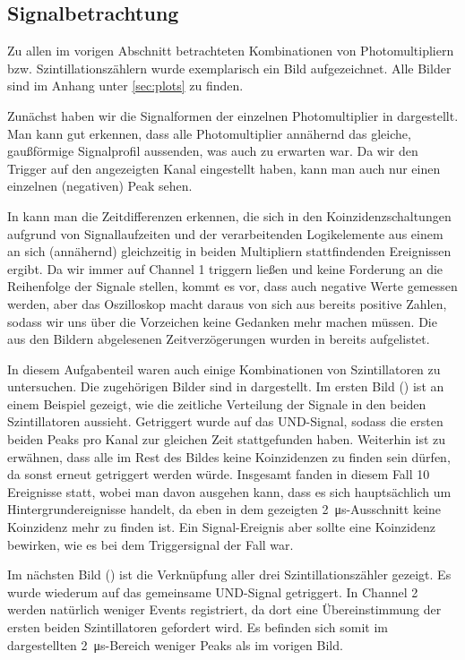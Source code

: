 \subsection{Signalbetrachtung}
Zu allen im vorigen Abschnitt betrachteten Kombinationen von Photomultipliern
bzw. Szintillationszählern wurde exemplarisch ein Bild aufgezeichnet. Alle
Bilder sind im Anhang unter \ref{sec:plots} zu finden.

Zunächst haben wir die Signalformen der einzelnen Photomultiplier in 
dargestellt. Man kann gut erkennen, dass alle Photomultiplier annähernd das
gleiche, gaußförmige Signalprofil aussenden, was auch zu erwarten war. Da wir
den Trigger auf den angezeigten Kanal eingestellt haben, kann man auch nur einen
einzelnen (negativen) Peak sehen.

In  kann man die Zeitdifferenzen erkennen, die sich in
den Koinzidenzschaltungen aufgrund von Signallaufzeiten und der verarbeitenden
Logikelemente aus einem an sich (annähernd) gleichzeitig in beiden Multipliern
stattfindenden Ereignissen ergibt. Da wir immer auf Channel 1 triggern ließen
und keine Forderung an die Reihenfolge der Signale stellen, kommt es vor, dass
auch negative Werte gemessen werden, aber das Oszilloskop macht daraus von sich
aus bereits positive Zahlen, sodass wir uns über die Vorzeichen keine Gedanken
mehr machen müssen. Die aus den Bildern abgelesenen Zeitverzögerungen wurden in
 bereits aufgelistet.

In diesem Aufgabenteil waren auch einige Kombinationen von Szintillatoren zu
untersuchen. Die zugehörigen Bilder sind in  dargestellt.
Im ersten Bild () ist an einem Beispiel gezeigt, wie die
zeitliche Verteilung der Signale in den beiden Szintillatoren aussieht.
Getriggert wurde auf das UND-Signal, sodass die ersten beiden Peaks pro Kanal
zur gleichen Zeit stattgefunden haben. Weiterhin ist zu erwähnen, dass alle im
Rest des Bildes keine Koinzidenzen zu finden sein dürfen, da sonst erneut
getriggert werden würde. Insgesamt fanden in diesem Fall 10 Ereignisse statt,
wobei man davon ausgehen kann, dass es sich hauptsächlich um
Hintergrundereignisse handelt, da eben in dem gezeigten
\SI{2}{\micro\second}-Ausschnitt keine Koinzidenz mehr zu finden ist. Ein
Signal-Ereignis aber sollte eine Koinzidenz bewirken, wie es bei dem
Triggersignal der Fall war.

Im nächsten Bild () ist die Verknüpfung aller drei
Szintillationszähler gezeigt. Es wurde wiederum auf das gemeinsame UND-Signal
getriggert. In Channel 2 werden natürlich weniger Events registriert, da dort
eine Übereinstimmung der ersten beiden Szintillatoren gefordert wird. Es
befinden sich somit im dargestellten \SI{2}{\micro\second}-Bereich weniger
Peaks als im vorigen Bild. 

